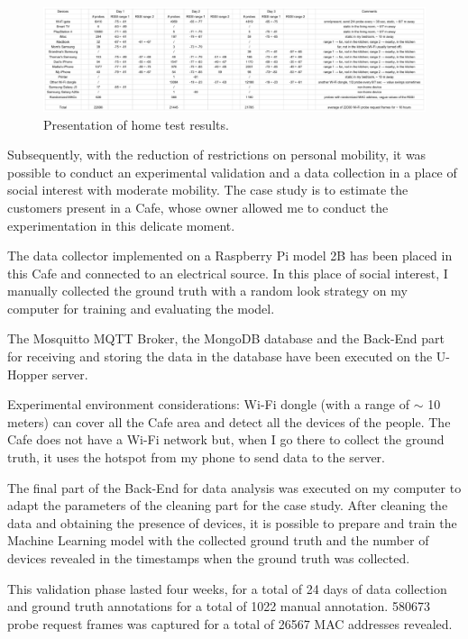 \begin{figure}[h]
\centering 
\includegraphics[width=1\textwidth]{images/sniffertest} 
\caption{Presentation of home test results.}
\label{fig:sniffertest}
\end{figure}

Subsequently, with the reduction of restrictions on personal mobility, it was possible to conduct an experimental validation and a data collection in a place of social interest with moderate mobility. The case study is to estimate the customers present in a Cafe, whose owner allowed me to conduct the experimentation in this delicate moment.

The data collector implemented on a Raspberry Pi model 2B has been placed in this Cafe and connected to an electrical source. In this place of social interest, I manually collected the ground truth with a random look strategy on my computer for training and evaluating the model.

The Mosquitto MQTT Broker, the MongoDB database and the Back-End part for receiving and storing the data in the database have been executed on the U-Hopper server.

Experimental environment considerations: Wi-Fi dongle (with a range of $\sim$ 10 meters) can cover all the Cafe area and detect all the devices of the people. The Cafe does not have a Wi-Fi network but, when I go there to collect the ground truth, it uses the hotspot from my phone to send data to the server.

The final part of the Back-End for data analysis was executed on my computer to adapt the parameters of the cleaning part for the case study. After cleaning the data and obtaining the presence of devices, it is possible to prepare and train the Machine Learning model with the collected ground truth and the number of devices revealed in the timestamps when the ground truth was collected.


This validation phase lasted four weeks, for a total of 24 days of data collection and ground truth annotations for a total of 1022 manual annotation. 580673 probe request frames was captured for a total of 26567 MAC addresses revealed.


